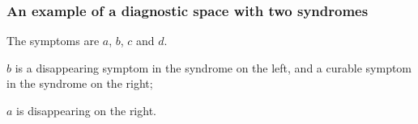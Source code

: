 \documentclass{beamer}
\def\itbul{\item[$\bullet$]}
\def\pha{\phantom}
\begin{document}
\begin{frame}
\center
\frametitle{An example of a diagnostic space with two syndromes}
\vspace*{-.5cm}

\hspace{-6cm}
\begin{minipage}{6.6cm}\small
\pha{xxx}The symptoms are $a$, $b$, $c$ and $d$.
\hspace{-.3cm}
\begin{roster}
\itbul $b$ is a disappearing symptom in the syndrome
on the left, and a curable symptom
in the syndrome on the right;
\vspace{-.2cm}

\itbul $a$ is disappearing on the right.
\end{roster}
\end{minipage}
\begin{center}
\vspace{-2.3cm}


\end{center}
\end{frame}
\end{document}
